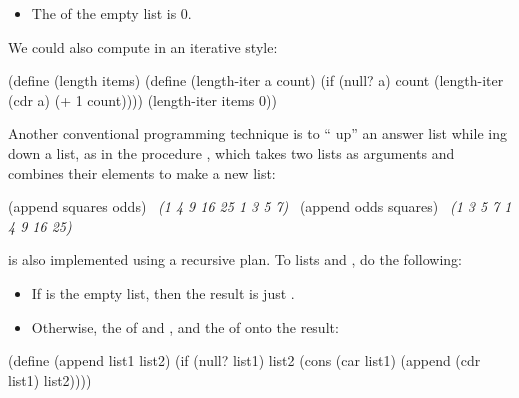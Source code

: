 \begin{itemize}
\item
The  of the empty list is 0.
\end{itemize}

\noindent
We could also compute  in an iterative style:

\begin{codeBlock}
(define (length items)
  (define (length-iter a count)
    (if (null? a)
        count
        (length-iter (cdr a) (+ 1 count))))
  (length-iter items 0))
\end{codeBlock}

\noindent
Another conventional programming technique is to `` up'' an answer
list while ing down a list, as in the procedure , which
takes two lists as arguments and combines their elements to make a new list:

\begin{codeBlock}
(append squares odds)
~\textit{(1 4 9 16 25 1 3 5 7)}~
(append odds squares)
~\textit{(1 3 5 7 1 4 9 16 25)}~
\end{codeBlock}

\noindent
{} is also implemented using a recursive plan.  To 
lists  and , do the following:

\begin{itemize}
\item
If  is the empty list, then the result is just .

\item
Otherwise,  the  of  and , and
 the  of  onto the result:
\end{itemize}

\begin{codeBlock}
(define (append list1 list2)
  (if (null? list1)
      list2
      (cons (car list1) (append (cdr list1) list2))))
\end{codeBlock}

